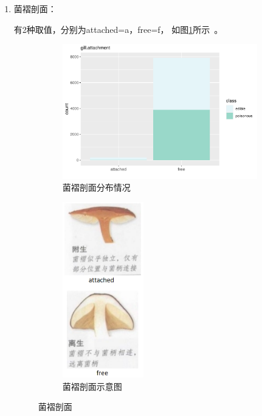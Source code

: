 \documentclass[lang=cn,11pt,a4paper,cite=super]{elegantpaper}
\begin{document}
\begin{enumerate}
   \item 菌褶剖面：\par 有2种取值，分别为attached=a，free=f，
   如图\ref{fig:gillatt}所示~\cite{mogutujian}。
   \begin{figure}[htb]
      \begin{subfigure}[b]{0.69\textwidth}
        \centering
        \includegraphics[width=\linewidth]{img/gillattachment-1.pdf}  
      \caption{菌褶剖面分布情况}
      \end{subfigure}
      \begin{subfigure}[b]{0.25\textwidth}
        \centering
        \includegraphics[width=\linewidth,height=3in]{img/gillatt.PNG}  
        \caption{菌褶剖面示意图}
      \end{subfigure}
      \caption{菌褶剖面}
      \label{fig:gillatt}
   \end{figure}


\end{enumerate}
\end{document}

